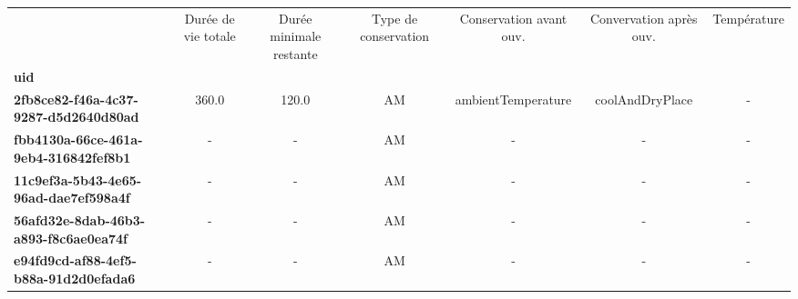 \begin{tabular}{lcccccc}
\toprule
{} &  Durée de vie totale &  Durée minimale restante & Type de conservation & Conservation avant ouv. & Convervation après ouv. & Température \\
\textbf{uid                                 } &                      &                          &                      &                         &                         &             \\
\midrule
\textbf{2fb8ce82-f46a-4c37-9287-d5d2640d80ad} &                360.0 &                    120.0 &                   AM &      ambientTemperature &         coolAndDryPlace &           - \\
\textbf{fbb4130a-66ce-461a-9eb4-316842fef8b1} &                    - &                        - &                   AM &                       - &                       - &           - \\
\textbf{11c9ef3a-5b43-4e65-96ad-dae7ef598a4f} &                    - &                        - &                   AM &                       - &                       - &           - \\
\textbf{56afd32e-8dab-46b3-a893-f8c6ae0ea74f} &                    - &                        - &                   AM &                       - &                       - &           - \\
\textbf{e94fd9cd-af88-4ef5-b88a-91d2d0efada6} &                    - &                        - &                   AM &                       - &                       - &           - \\
\bottomrule
\end{tabular}

